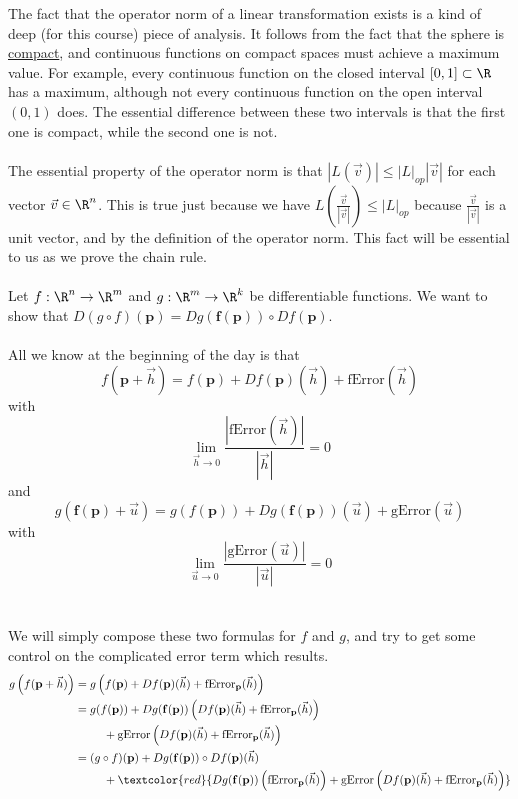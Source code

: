\documentclass{ximera}
\begin{document}
	The fact that the operator norm of a linear transformation exists is a kind of deep (for this course) piece of analysis.  It follows from the fact that the sphere is
	\href{http://en.wikipedia.org/wiki/Compact_space}{compact}, and continuous functions on compact spaces must achieve a maximum value.  For example, every continuous function on the closed interval
	$[0,1] \subset \R$ has a maximum, although not every continuous function on the open interval $(0,1)$ does.  The essential difference between 
	these two intervals is that the first one is compact, while the second one is not.
	\\
	\\
	The essential property of the operator norm is that $|L(\vec{v})| \leq |L|_{op} |\vec{v}|$ for each vector $\vec{v} \in \R^n$.  This is true just because we have 
	$L(\frac{\vec{v}}{|\vec{v}|}) \leq |L|_{op}$ because $\frac{\vec{v}}{|\vec{v}|}$ is a unit vector, and by the definition of the operator norm.  This fact will be essential 
	to us as we prove the chain rule.
	\\
	\\
	Let $f:\R^n \to \R^m$ and $g:\R^m \to \R^k$ be differentiable functions.  
	We want to show that $D(g \circ f)(\mathbf{p}) = Dg(\mathbf{f(p)}) \circ Df(\mathbf{p})$.
	\\
	\\
	All we know at the beginning of the day is that  
	\[f(\mathbf{p}+\vec{h}) = f(\mathbf{p})+Df(\mathbf{p})(\vec{h})+\text{fError}(\vec{h})\]
	 with 
	\[\lim_{\vec{h} \to 0} \frac{\left| \text{fError}(\vec{h})\right|}{|\vec{h}|} = 0\]
	 and 
	 \[g(\mathbf{f(p)}+\vec{u}) = g(f(\mathbf{p}))+Dg(\mathbf{f(p)})(\vec{u})+\text{gError}(\vec{u})\]
	 with 
	\[ \lim_{\vec{u} \to 0} \frac{\left| \text{gError}(\vec{u})\right|}{|\vec{u}|} = 0\]
	\\
	\\
	We will simply compose these two formulas for $f$ and $g$, and try to get some control on the complicated error term which results.
	\begin{align*}
	g\left(f(\mathbf{p}+\vec{h})\right) &= g\left( f(\mathbf{p})+Df(\mathbf{p})(\vec{h})+\text{fError}_{\mathbf{p}}(\vec{h})\right)\\
		&= g(f(\mathbf{p}))+Dg(\mathbf{f(p)})\left(Df(\mathbf{p})(\vec{h})+ \text{fError}_{\mathbf{p}}(\vec{h})\right)\\
		&\hphantom{dsdsd}+\text{gError}\left(Df(\mathbf{p})(\vec{h})+\text{fError}_{\mathbf{p}}(\vec{h})\right)\\
		&= (g \circ f)(\mathbf{p})+Dg(\mathbf{f(p)}) \circ Df(\mathbf{p})(\vec{h})\\
		&\hphantom{dsdsd}+ \textcolor{red}{Dg(\mathbf{f(p)})\left(\text{fError}_{\mathbf{p}}(\vec{h})\right) + \text{gError}\left(Df(\mathbf{p})(\vec{h})+\text{fError}_{\mathbf{p}}(\vec{h})\right)}\\
	\end{align*}
	
\end{document}
